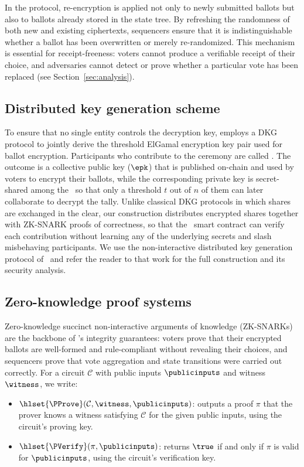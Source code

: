 In the protocol, re-encryption is applied not only to newly submitted ballots but also to ballots already stored in the state tree. By refreshing the randomness of both new and existing ciphertexts, sequencers ensure that it is indistinguishable whether a ballot has been overwritten or merely re-randomized. This mechanism is essential for receipt-freeness: voters cannot produce a verifiable receipt of their choice, and adversaries cannot detect or prove whether a particular vote has been replaced (see Section~\ref{sec:analysis}).

\subsection{Distributed key generation scheme}
\label{sec:cryptographic-primitives:dkg}

To ensure that no single entity controls the decryption key, \davinci employs a \ac{DKG} protocol to jointly derive the threshold ElGamal encryption key pair used for ballot encryption. Participants who contribute to the ceremony are called \emph{\keywardens}. The outcome is a collective public key ($\epk$) that is published on-chain and used by voters to encrypt their ballots, while the corresponding private key is secret-shared among the \keywardens\ so that only a threshold $t$ out of $n$ of them can later collaborate to decrypt the tally. Unlike classical \ac{DKG} protocols in which shares are exchanged in the clear, our construction distributes encrypted shares together with \ac{ZK-SNARK} proofs of correctness, so that the \hlget{\dkgmanagement}\ smart contract can verify each contribution without learning any of the underlying secrets and slash misbehaving participants. We use the non-interactive distributed key generation protocol of~\cite{kampa2026dkg} and refer the reader to that work for the full construction and its security analysis.

\subsection{Zero-knowledge proof systems}
\label{sec:cryptographic-primitives:zkp}

Zero-knowledge succinct non-interactive arguments of knowledge (\acp{ZK-SNARK}) are the backbone of \davinci's integrity guarantees: voters prove that their encrypted ballots are well-formed and rule-compliant without revealing their choices, and sequencers prove that vote aggregation and state transitions were carried out correctly. For a circuit $\mathcal{C}$ with public inputs $\publicinputs$ and witness $\witness$, we write:
\begin{itemize}
	\item $\hlset{\PProve}(\mathcal{C}, \witness, \publicinputs)$: outputs a proof $\pi$ that the prover knows a witness satisfying $\mathcal{C}$ for the given public inputs, using the circuit's proving key.
	\item $\hlset{\PVerify}(\pi, \publicinputs)$: returns $\true$ if and only if $\pi$ is valid for $\publicinputs$, using the circuit's verification key.
\end{itemize}

